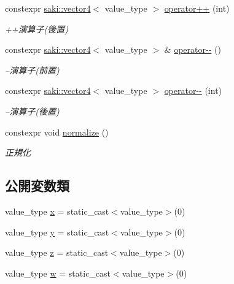 \begin{DoxyCompactItemize}
constexpr \mbox{\hyperlink{classsaki_1_1vector4}{saki\+::vector4}}$<$ value\+\_\+type $>$ \mbox{\hyperlink{classsaki_1_1vector4_ab0ac68c756d4435af9255a9635dc33ed}{operator++}} (int)
\begin{DoxyCompactList}\small\item\em ++演算子(後置) \end{DoxyCompactList}\item 
constexpr \mbox{\hyperlink{classsaki_1_1vector4}{saki\+::vector4}}$<$ value\+\_\+type $>$ \& \mbox{\hyperlink{classsaki_1_1vector4_a602623df1870e123f03b8948f3f0f5df}{operator-\/-\/}} ()
\begin{DoxyCompactList}\small\item\em --演算子(前置) \end{DoxyCompactList}\item 
constexpr \mbox{\hyperlink{classsaki_1_1vector4}{saki\+::vector4}}$<$ value\+\_\+type $>$ \mbox{\hyperlink{classsaki_1_1vector4_af0937fd1074b0ab42f0c95ba1229817b}{operator-\/-\/}} (int)
\begin{DoxyCompactList}\small\item\em --演算子(後置) \end{DoxyCompactList}\item 
constexpr void \mbox{\hyperlink{classsaki_1_1vector4_a559bf8b322a0949cfe985ec82e32b2f4}{normalize}} ()
\begin{DoxyCompactList}\small\item\em 正規化 \end{DoxyCompactList}\end{DoxyCompactItemize}
\subsection*{公開変数類}
\begin{DoxyCompactItemize}
\item 
value\+\_\+type \mbox{\hyperlink{classsaki_1_1vector4_a8b2ff4254dd0ba142490c77927bfbf8e}{x}} = static\+\_\+cast$<$value\+\_\+type$>$(0)
\item 
value\+\_\+type \mbox{\hyperlink{classsaki_1_1vector4_a827cd630cd250d5fe85290f6671dbe0b}{y}} = static\+\_\+cast$<$value\+\_\+type$>$(0)
\item 
value\+\_\+type \mbox{\hyperlink{classsaki_1_1vector4_a42ece0235847ec6ee945516d4dc3ab48}{z}} = static\+\_\+cast$<$value\+\_\+type$>$(0)
\item 
value\+\_\+type \mbox{\hyperlink{classsaki_1_1vector4_a4db38b2a56279d65d701b14c21f7b073}{w}} = static\+\_\+cast$<$value\+\_\+type$>$(0)
\end{DoxyCompactItemize}


